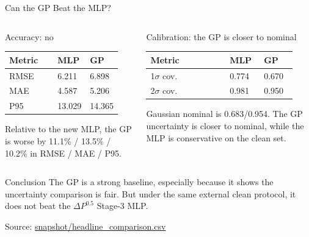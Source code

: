 \documentclass[aspectratio=169,11pt]{beamer}
\newcommand{\good}[1]{\textcolor{goodGreen}{#1}}
\newcommand{\sourcenote}[1]{\vfill{\tiny\textcolor{gray!70!black}{Source: \url{#1}}}}
\begin{document}
\begin{frame}{Can the GP Beat the MLP?}
\small
\begin{columns}[T,onlytextwidth]
\begin{column}{0.48\linewidth}
\begin{block}{Accuracy: no}
{\setlength{\tabcolsep}{3pt}
\begin{tabular}{L{0.48\linewidth}R{0.20\linewidth}R{0.20\linewidth}}
\toprule
Metric & MLP & GP \\
\midrule
RMSE & \good{6.211} & 6.898 \\
MAE & \good{4.587} & 5.206 \\
P95 & \good{13.029} & 14.365 \\
\bottomrule
\end{tabular}
}

\vspace{0.4em}
\footnotesize
Relative to the new MLP, the GP is worse by 11.1\% / 13.5\% / 10.2\% in RMSE / MAE / P95.
\end{block}
\end{column}

\begin{column}{0.48\linewidth}
\begin{block}{Calibration: the GP is closer to nominal}
{\setlength{\tabcolsep}{3pt}
\begin{tabular}{L{0.48\linewidth}R{0.20\linewidth}R{0.20\linewidth}}
\toprule
Metric & MLP & GP \\
\(\sigma\) cov. & 0.774 & \good{0.670} \\
2\(\sigma\) cov. & 0.981 & \good{0.950} \\
\bottomrule
\end{tabular}
}

\vspace{0.4em}
\footnotesize
Gaussian nominal is 0.683/0.954. The GP uncertainty is closer to nominal, while the MLP is conservative on the
clean set.
\end{block}
\end{column}
\end{columns}

\vspace{0.2em}
\begin{block}{Conclusion}
The GP is a strong baseline, especially because it shows the uncertainty comparison is fair. But under the same
external clean protocol, it does not beat the \(\Delta P^{0.5}\) Stage-3 MLP.
\end{block}

\sourcenote{snapshot/headline_comparison.csv}
\end{frame}
\end{document}
